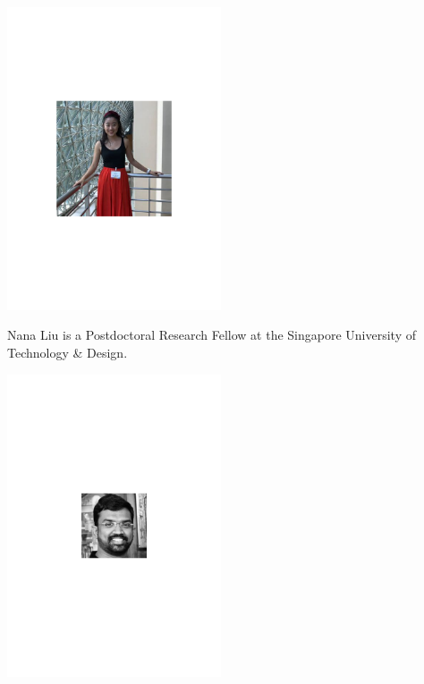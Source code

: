 \begin{center}
\includegraphics[width=0.475\textwidth]{photo_nana_liu}
\end{center}

Nana Liu is a Postdoctoral Research Fellow at the Singapore University of Technology \& Design.


%
%




%
%

\begin{center}
\includegraphics[width=0.475\textwidth]{photo_rohit_ramakrishnan}
\end{center}

